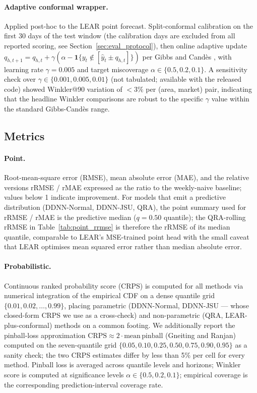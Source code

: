 \documentclass[review,3p,times,authoryear]{elsarticle}
\begin{document}
\paragraph{Adaptive conformal wrapper.} Applied post-hoc to the LEAR point forecast. Split-conformal calibration on the first 30 days of the test window (the calibration days are excluded from all reported scoring, see Section~\ref{sec:eval_protocol}), then online adaptive update \(q_{h, t+1} = q_{h, t} + \gamma (\alpha - \mathbf{1}\{y_t \notin [\hat{y}_t \pm q_{h, t}]\})\) per Gibbs and Cand\`es \citep{gibbs2021}, with learning rate \(\gamma = 0.005\) and target miscoverage \(\alpha \in \{0.5, 0.2, 0.1\}\). A sensitivity check over \(\gamma\in\{0.001, 0.005, 0.01\}\) (not tabulated; available with the released code) showed Winkler@90 variation of \(<3\%\) per (area, market) pair, indicating that the headline Winkler comparisons are robust to the specific \(\gamma\) value within the standard Gibbs-Cand\`es range.

\subsection{Metrics}\label{sec:metrics}
\paragraph{Point.} Root-mean-square error (RMSE), mean absolute error (MAE), and the relative versions rRMSE / rMAE expressed as the ratio to the weekly-naive baseline; values below 1 indicate improvement. For models that emit a predictive distribution (DDNN-Normal, DDNN-JSU, QRA), the point summary used for rRMSE / rMAE is the predictive median (\(q=0.50\) quantile); the QRA-rolling rRMSE in Table~\ref{tab:point_rrmse} is therefore the rRMSE of its median quantile, comparable to LEAR's MSE-trained point head with the small caveat that LEAR optimises mean squared error rather than median absolute error.

\paragraph{Probabilistic.} Continuous ranked probability score (CRPS) is computed for all methods via numerical integration of the empirical CDF on a dense quantile grid \(\{0.01, 0.02, \ldots, 0.99\}\), placing parametric (DDNN-Normal, DDNN-JSU --- whose closed-form CRPS we use as a cross-check) and non-parametric (QRA, LEAR-plus-conformal) methods on a common footing. We additionally report the pinball-loss approximation \(\mathrm{CRPS} \approx 2 \cdot \mathrm{mean\,pinball}\) (Gneiting and Ranjan) computed on the seven-quantile grid \(\{0.05, 0.10, 0.25, 0.50, 0.75, 0.90, 0.95\}\) as a sanity check; the two CRPS estimates differ by less than 5\% per cell for every method. Pinball loss is averaged across quantile levels and horizons; Winkler score \citep{winkler1972} is computed at significance levels \(\alpha \in \{0.5, 0.2, 0.1\}\); empirical coverage is the corresponding prediction-interval coverage rate.
\end{document}
